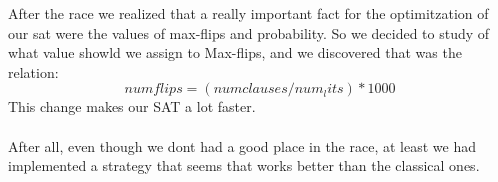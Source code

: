 
After the race we realized that a really important fact for the optimitzation of our sat were the values of max-flips and probability. So we decided to study of what value showld we assign to Max-flips, and we discovered that was the relation: 
$$num flips = (num clauses / num_lits) * 1000$$ 
This change makes our SAT a lot faster.\\
\\
After all, even though we dont had a good place in the race, at least we had implemented a strategy that seems that works better than the classical ones.

